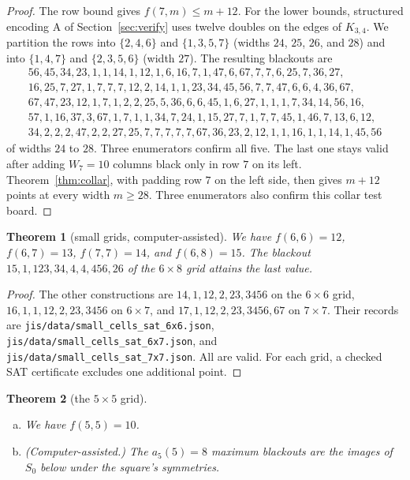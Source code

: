 \documentclass[12pt]{article}
\theoremstyle{plain}
\newtheorem{theorem}{Theorem}
\theoremstyle{definition}
\theoremstyle{remark}
\begin{document}
\begin{proof}
The row bound gives $f(7,m)\le m+12$. For the lower bounds, structured encoding A
of Section~\ref{sec:verify} uses twelve doubles on the edges of $K_{3,4}$.
We partition the rows into $\{2,4,6\}$ and $\{1,3,5,7\}$ (widths $24$, $25$, $26$, and $28$) and into
$\{1,4,7\}$ and $\{2,3,5,6\}$ (width $27$). The resulting blackouts are
\begin{gather*}
56,45,34,23,1,1,14,1,12,1,6,16,7,1,47,6,67,7,7,6,25,7,36,27,\\
16,25,7,27,1,7,7,7,12,2,14,1,1,23,34,45,56,7,7,47,6,6,4,36,67,\\
67,47,23,12,1,7,1,2,2,25,5,36,6,6,45,1,6,27,1,1,1,7,34,14,56,16,\\
57,1,16,37,3,67,1,7,1,1,34,7,24,1,15,27,7,1,7,7,45,1,46,7,13,6,12,\\
34,2,2,2,47,2,2,27,25,7,7,7,7,7,67,36,23,2,12,1,1,16,1,1,14,1,45,56
\end{gather*}
of widths $24$ to $28$. Three enumerators confirm all five. The last one stays valid after adding
$W_7=10$ columns black only in row $7$ on its left. Theorem~\ref{thm:collar}, with padding
row $7$ on the left side, then gives $m+12$ points at every width $m\ge28$.
Three enumerators also confirm this collar test board.
\end{proof}

\begin{theorem}[small grids, computer-assisted]\label{thm:refute}
We have $f(6,6)=12$, $f(6,7)=13$, $f(7,7)=14$, and $f(6,8)=15$. The blackout
$15,\allowbreak 1,\allowbreak 123,\allowbreak 34,\allowbreak 4,\allowbreak 4,\allowbreak 456,\allowbreak 26$ of the $6\times8$ grid attains the last value.
\end{theorem}

\begin{proof}
The other constructions are $14,\allowbreak 1,\allowbreak 12,\allowbreak 2,\allowbreak 23,\allowbreak 3456$
on the $6\times6$ grid,
$16,\allowbreak 1,\allowbreak 1,\allowbreak 12,\allowbreak 2,\allowbreak 23,\allowbreak 3456$
on $6\times7$, and
$17,\allowbreak 1,\allowbreak 12,\allowbreak 2,\allowbreak 23,\allowbreak 3456,\allowbreak 67$
on $7\times7$. Their records are
\nolinkurl{jis/data/small_cells_sat_6x6.json},
\nolinkurl{jis/data/small_cells_sat_6x7.json}, and
\nolinkurl{jis/data/small_cells_sat_7x7.json}.
All are valid. For each grid, a checked SAT certificate excludes
one additional point.
\end{proof}

\begin{theorem}[the $5\times5$ grid]\label{thm:fivefive}
\leavevmode
\begin{enumerate}[(a)]
\item We have $f(5,5)=10$.
\item (Computer-assisted.) The $a_5(5)=8$ maximum blackouts are the images of $S_0$
below under the square's symmetries.
\end{enumerate}
\end{theorem}
\end{document}
